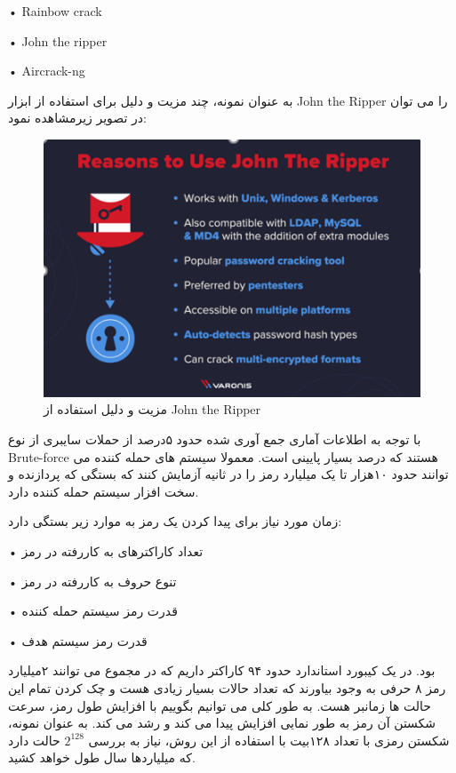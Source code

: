 •	Rainbow crack

•	John the ripper

•	Aircrack-ng

به عنوان نمونه، چند مزیت و دلیل برای استفاده از ابزار John the Ripper را می توان در تصویر زیرمشاهده نمود:

\begin{figure}[ht!]
    \centering
    \includegraphics[width=0.5\linewidth]{images/image.png}
    \caption{مزیت و دلیل استفاده از John the Ripper}
    \label{fig:dynamicprogramming}
\end{figure}

با توجه به اطلاعات آماری جمع آوری شده حدود ۵درصد از حملات سایبری از نوع Brute-force هستند که درصد بسیار پایینی است.
معمولا سیستم های حمله کننده می توانند حدود ۱۰هزار تا یک میلیارد رمز را در ثانیه آزمایش کنند
که بستگی که پردازنده و سخت افزار سیستم حمله کننده دارد.

زمان مورد نیاز برای پیدا کردن یک رمز به موارد زیر بستگی دارد:

•	تعداد کاراکترهای به کاررفته در رمز

•	تنوع حروف به کاررفته در رمز

•	 قدرت رمز سیستم حمله کننده

•	 قدرت رمز سیستم هدف


بود. در یک کیبورد استاندارد حدود ۹۴ کاراکتر داریم که در مجموع می توانند ۲میلیارد رمز ۸ حرفی به وجود بیاورند که تعداد حالات بسیار زیادی هست و چک کردن تمام این حالت ها زمانبر هست. به طور کلی می توانیم بگوییم با افزایش طول رمز، سرعت شکستن آن رمز به طور نمایی افزایش پیدا می کند و رشد می کند. به عنوان نمونه، شکستن رمزی با تعداد ۱۲۸بیت با استفاده از این روش، نیاز به بررسی \(2^{128}\) حالت دارد که میلیاردها سال طول خواهد کشید. \\ \\

